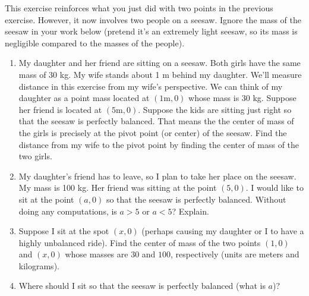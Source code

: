 \begin{problem}
This exercise reinforces what you just did with two points in the previous exercise. However, it now involves two people on a seesaw. %
Ignore the mass of the seesaw in your work below (pretend it's an extremely light seesaw, so its mass is negligible compared to the masses of the people).
\begin{enumerate}
 \item 
 My daughter and her friend are sitting on a seesaw.  Both girls have the same mass of 30 kg. My wife stands about 1 m behind my daughter. We'll measure distance in this exercise from my wife's perspective.  We can think of my daughter as a point mass located at $(1\text{m},0)$ whose mass is $30$ kg. Suppose her friend is located at $(5\text{m},0)$. Suppose the kids are sitting just right so that the seesaw is perfectly balanced.  That means the the center of mass of the girls is precisely at the pivot point (or center) of the seesaw. Find the distance from my wife to the pivot point by finding the center of mass of the two girls. 
 \item My daughter's friend has to leave, so I plan to take her place on the seesaw. My mass is 100 kg. Her friend was sitting at the point $(5,0)$. I would like to sit at the point $(a,0)$ so that the seesaw is perfectly balanced. Without doing any computations, is $a>5$ or $a<5$? Explain.
 \item Suppose I sit at the spot $(x,0)$ (perhaps causing my daughter or I to have a highly unbalanced ride). Find the center of mass of the two points $(1,0)$ and $(x,0)$ whose masses are $30$ and $100$, respectively (units are meters and kilograms). 
 \item Where should I sit so that the seesaw is perfectly balanced (what is $a$)?
\end{enumerate}
\end{problem}

